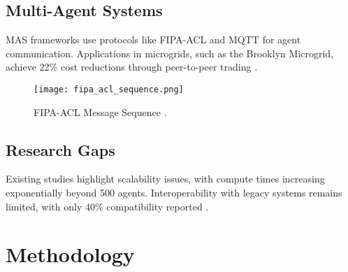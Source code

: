 \documentclass[12pt]{report}
\begin{document}
\section{Multi-Agent Systems}
\begin{doublespace}
MAS frameworks use protocols like FIPA-ACL and MQTT for agent communication. Applications in microgrids, such as the Brooklyn Microgrid, achieve 22\% cost reductions through peer-to-peer trading \cite{Brooklyn2020}.
\end{doublespace}
\begin{figure}[h]
    \centering
    \texttt{[image: fipa\_acl\_sequence.png]}
    \caption{FIPA-ACL Message Sequence \cite{FIPA2020}.}
    \label{fig:fipa_acl}
\end{figure}

\section{Research Gaps}
\begin{doublespace}
Existing studies highlight scalability issues, with compute times increasing exponentially beyond 500 agents. Interoperability with legacy systems remains limited, with only 40\% compatibility reported \cite{Zhang2021}.
\end{doublespace}

\chapter{Methodology}
\thispagestyle{empty}
\end{document}
